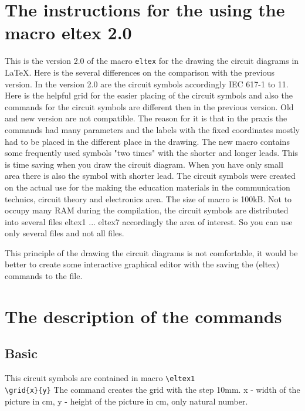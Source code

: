 




\section{The instructions for the using the macro eltex 2.0}
This is the version 2.0 of the macro \verb?eltex? for the drawing the
circuit diagrams in \LaTeX . Here is the several differences on the
comparison with the previous version.
In the version 2.0 are the circuit symbols accordingly IEC 617-1 to 11.
Here is the helpful grid for the easier placing of the circuit symbols
and also the commands for the circuit symbols are different
then in the previous version. 
Old and new version are not compatible.
The reason for it is that in the praxis the commands had many
parameters and the labels with the fixed coordinates mostly had to be
placed in the different place in the drawing. The new macro
contains some frequently used symbols "two times"
with the shorter and longer leads. This is time saving when you draw
the circuit diagram.
When you have only small area there is also the symbol with shorter
lead. The circuit symbols were created on the actual use
for the making the education materials in the communication technics,
circuit theory and electronics area. The size of macro is 100kB.
Not to occupy many RAM during the compilation, the
circuit symbols are distributed into several files eltex1 ... eltex7
accordingly the area of interest.
So you can use only several files and not all files.

This principle of the drawing the circuit diagrams is not comfortable,
it would be better to create some interactive graphical editor with the
saving the (eltex) commands to the file. 




\section{The description of the commands}
\subsection{Basic}
This circuit symbols are contained in macro \verb?\eltex1? \\

\noindent
\verb?\grid{x}{y}?
The command creates the grid with the step 10mm.
x - width of the picture in cm, y - height of the picture in cm,
only natural number.


